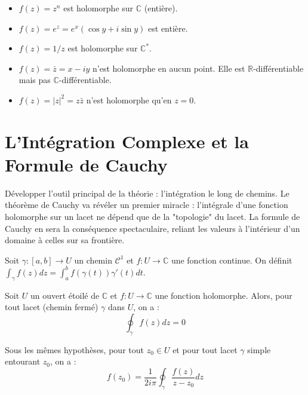 \begin{example}
    \begin{itemize}
        \item $f(z) = z^n$ est holomorphe sur $\mathbb{C}$ (entière).
        \item $f(z) = e^z = e^x(\cos y + i\sin y)$ est entière.
        \item $f(z) = 1/z$ est holomorphe sur $\mathbb{C}^*$.
        \item $f(z) = \bar{z} = x - iy$ n'est holomorphe en aucun point. Elle est $\mathbb{R}$-différentiable mais pas $\mathbb{C}$-différentiable.
        \item $f(z) = |z|^2 = z\bar{z}$ n'est holomorphe qu'en $z=0$.
    \end{itemize}
\end{example}

\section{L'Intégration Complexe et la Formule de Cauchy}

\begin{objectif}
    Développer l'outil principal de la théorie : l'intégration le long de chemins. Le théorème de Cauchy va révéler un premier miracle : l'intégrale d'une fonction holomorphe sur un lacet ne dépend que de la "topologie" du lacet. La formule de Cauchy en sera la conséquence spectaculaire, reliant les valeurs à l'intérieur d'un domaine à celles sur sa frontière.
\end{objectif}

\begin{definition}
    Soit $\gamma: [a,b] \to U$ un chemin $\mathcal{C}^1$ et $f: U \to \mathbb{C}$ une fonction continue. On définit $\int_\gamma f(z) dz = \int_a^b f(\gamma(t))\gamma'(t) dt$.
\end{definition}

\begin{theorem}
    Soit $U$ un ouvert étoilé de $\mathbb{C}$ et $f: U \to \mathbb{C}$ une fonction holomorphe. Alors, pour tout lacet (chemin fermé) $\gamma$ dans $U$, on a :
    $$ \oint_\gamma f(z) dz = 0 $$
\end{theorem}

\begin{theorem}
    Sous les mêmes hypothèses, pour tout $z_0 \in U$ et pour tout lacet $\gamma$ simple entourant $z_0$, on a :
    $$ f(z_0) = \frac{1}{2i\pi} \oint_\gamma \frac{f(z)}{z-z_0} dz $$
\end{theorem}

